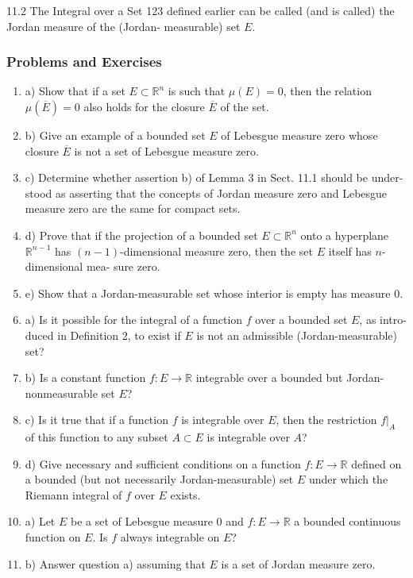 11.2 The Integral over a Set
123
defined earlier can be called (and is called) the Jordan measure of the (Jordan-
measurable) set $E$.
\subsubsection{Problems and Exercises}
\begin{enumerate}
    \item a) Show that if a set $E \subset \mathbb{R}^n$ is such that $\mu(E) = 0$, then the relation $\mu(\overline{E}) = 0$
    also holds for the closure $\overline{E}$ of the set.
    \item b) Give an example of a bounded set $E$ of Lebesgue measure zero whose closure
    $\overline{E}$ is not a set of Lebesgue measure zero.
    \item c) Determine whether assertion b) of Lemma 3 in Sect. 11.1 should be under-
    stood as asserting that the concepts of Jordan measure zero and Lebesgue measure
    zero are the same for compact sets.
    \item d) Prove that if the projection of a bounded set $E \subset \mathbb{R}^n$ onto a hyperplane $\mathbb{R}^{n-1}$
    has $(n-1)$-dimensional measure zero, then the set $E$ itself has $n$-dimensional mea-
    sure zero.
    \item e) Show that a Jordan-measurable set whose interior is empty has measure $0$.
    \item a) Is it possible for the integral of a function $f$ over a bounded set $E$, as intro-
    duced in Definition 2, to exist if $E$ is not an admissible (Jordan-measurable) set?
    \item b) Is a constant function $f : E \to \mathbb{R}$ integrable over a bounded but Jordan-
    nonmeasurable set $E$?
    \item c) Is it true that if a function $f$ is integrable over $E$, then the restriction $f|_A$ of
    this function to any subset $A \subset E$ is integrable over $A$?
    \item d) Give necessary and sufficient conditions on a function $f : E \to \mathbb{R}$ defined on
    a bounded (but not necessarily Jordan-measurable) set $E$ under which the Riemann
    integral of $f$ over $E$ exists.
    \item a) Let $E$ be a set of Lebesgue measure $0$ and $f : E \to \mathbb{R}$ a bounded continuous
    function on $E$. Is $f$ always integrable on $E$?
    \item b) Answer question a) assuming that $E$ is a set of Jordan measure zero.

\end{enumerate}
